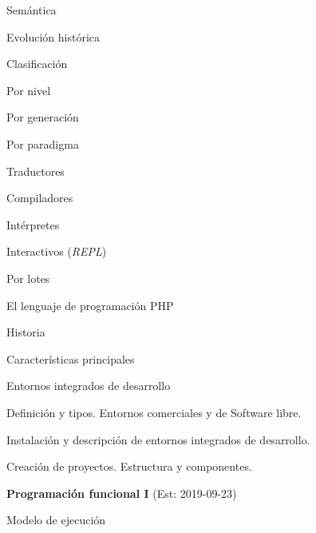 \begin{longenum}
\begin{longenum}
\begin{longenum}
\begin{longenum}
\begin{longenum}
                \end{longenum}
                \item Semántica
            \end{longenum}
            \item Evolución histórica
            \item Clasificación
            \begin{longenum}
                \item Por nivel
                \item Por generación
                \item Por paradigma
            \end{longenum}
        \end{longenum}
        \item Traductores
        \begin{longenum}
            \item Compiladores
            \item Intérpretes
            \begin{longenum}
                \item Interactivos (\textit{REPL})
                \item Por lotes
            \end{longenum}
        \end{longenum}
        \item El lenguaje de programación PHP
        \begin{longenum}
            \item Historia
            \item Características principales
        \end{longenum}
        \item Entornos integrados de desarrollo
        \begin{longenum}
            \item Definición y tipos. Entornos comerciales y de Software libre.
            \item Instalación y descripción de entornos integrados de desarrollo.
            \item Creación de proyectos. Estructura y componentes.
        \end{longenum}
    \end{longenum}
    \item \textbf{Programación funcional I}  (Est: 2019-09-23)
    \begin{longenum}
        \item Modelo de ejecución

\end{longenum}
\end{longenum}
